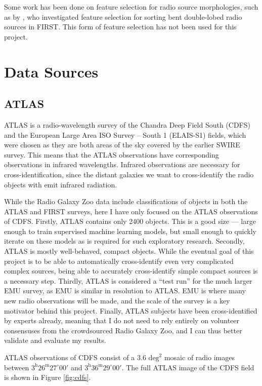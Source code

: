 \documentclass[a4paper]{article}
\newcommand{\fig}{Figure }
\begin{document}
      Some work has been done on feature selection for radio source morphologies, such as by \citet{proctor06}, who investigated feature selection for sorting bent double-lobed radio sources in FIRST. This form of feature selection has not been used for this project.

  \section{Data Sources}

    \subsection{ATLAS}
    \label{sec:atlas}

      ATLAS is a radio-wavelength survey of the Chandra Deep Field South (CDFS) and the European Large Area ISO Survey -- South 1 (ELAIS-S1) fields, which were chosen as they are both areas of the sky covered by the earlier SWIRE survey. This means that the ATLAS observations have corresponding observations in infrared wavelengths\cite{franzen15}. Infrared observations are necessary for cross-identification, since the distant galaxies we want to cross-identify the radio objects with emit infrared radiation.

      While the Radio Galaxy Zoo data include classifications of objects in both the ATLAS and FIRST surveys, here I have only focused on the ATLAS observations of CDFS. Firstly, ATLAS contains only 2400 objects. This is a good size --- large enough to train supervised machine learning models, but small enough to quickly iterate on these models as is required for such exploratory research. Secondly, ATLAS is mostly well-behaved, compact objects. While the eventual goal of this project is to be able to automatically cross-identify even very complicated complex sources, being able to accurately cross-identify simple compact sources is a necessary step. Thirdly, ATLAS is considered a ``test run'' for the much larger EMU survey, as EMU is similar in resolution to ATLAS\cite{franzen15}. EMU is where many new radio observations will be made, and the scale of the survey is a key motivator behind this project. Finally, ATLAS subjects have been cross-identified by experts already\cite{norris06}, meaning that I do not need to rely entirely on volunteer consensuses from the crowdsourced Radio Galaxy Zoo, and I can thus better validate and evaluate my results.

      ATLAS observations of CDFS consist of a $3.6 \text{ deg}^2$ mosaic of radio images between $3^\text{h}26^\text{m} 27^\circ 00'$ and $3^\text{h}36^\text{m} 29^\circ 00'$. The full ATLAS image of the CDFS field is shown in \fig \ref{fig:cdfs}.
\end{document}

